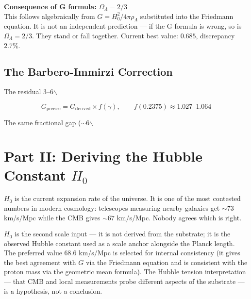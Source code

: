 \documentclass[11pt,letterpaper]{article}
\newenvironment{plainbox}{\begin{tcolorbox}[colback=blue!3!white,colframe=blue!40!white,title={\small\textit{In plain language}},breakable]}{\end{tcolorbox}}
\newenvironment{predbox}{\begin{tcolorbox}[colback=violet!3!white,colframe=violet!50!black,title={\small\textit{Testable prediction}},breakable]}{\end{tcolorbox}}
\begin{document}
\begin{predbox}
\textbf{Consequence of G formula: $\Omega_\Lambda = 2/3$}\\[4pt]
This follows algebraically from $G = H_0^2/4\pi\rho_\Lambda$ substituted into the Friedmann equation. It is not an independent prediction --- if the G formula is wrong, so is $\Omega_\Lambda = 2/3$. They stand or fall together. Current best value: $0.685$, discrepancy $2.7\%$.
\end{predbox}

\subsection{The Barbero-Immirzi Correction}
\label{sec:org9dd91fc}

The residual 3--6$\backslash$%

\begin{equation}
G_\text{precise} = G_\text{derived} \times f(\gamma), \qquad f(0.2375) \approx 1.027\text{--}1.064
\end{equation}

The same fractional gap (\(\sim\)6$\backslash$%

\section{Part II: Deriving the Hubble Constant \(H_0\)}
\label{sec:orgea3fd8a}

\begin{plainbox}
$H_0$ is the current expansion rate of the universe. It is one of the most contested numbers in modern cosmology: telescopes measuring nearby galaxies get ${\sim}73$ km/s/Mpc while the CMB gives ${\sim}67$ km/s/Mpc. Nobody agrees which is right.

\(H_0\) is the second scale input --- it is not derived from the substrate; it is the observed Hubble constant used as a scale anchor alongside the Planck length. The preferred value 68.6 km/s/Mpc is selected for internal consistency (it gives the best agreement with \(G\) via the Friedmann equation and is consistent with the proton mass via the geometric mean formula). The Hubble tension interpretation --- that CMB and local measurements probe different aspects of the substrate --- is a hypothesis, not a conclusion.
\end{plainbox}
\end{document}
